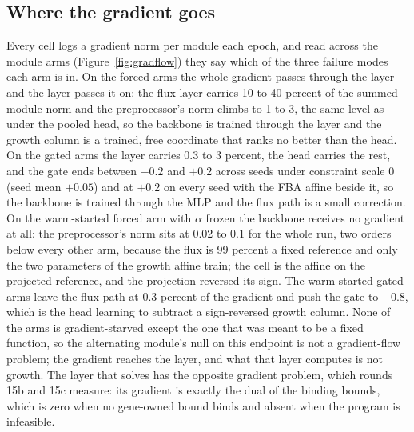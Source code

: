 

\subsection{Where the gradient goes}

Every cell logs a gradient norm per module each epoch, and read across the module arms
(Figure~\ref{fig:gradflow}) they say which of the three failure modes each arm is in. On
the forced arms the whole gradient passes through the layer and the layer passes it on:
the flux layer carries 10 to 40 percent of the summed module norm and the preprocessor's
norm climbs to 1 to 3, the same level as under the pooled head, so the backbone is
trained through the layer and the growth column is a trained, free coordinate that ranks
no better than the head. On the gated arms the layer carries 0.3 to 3 percent, the head
carries the rest, and the gate ends between $-0.2$ and $+0.2$ across seeds under
constraint scale 0 (seed mean $+0.05$) and at $+0.2$ on every seed with the FBA affine
beside it, so the backbone is trained through the MLP and the flux path is a small
correction. On the warm-started forced arm with $\alpha$ frozen the
backbone receives no gradient at all: the preprocessor's norm sits at 0.02 to 0.1 for the
whole run, two orders below every other arm, because the flux is 99 percent a fixed
reference and only the two parameters of the growth affine train; the cell is the affine
on the projected reference, and the projection reversed its sign. The warm-started gated
arms leave the flux path at 0.3 percent of the gradient and push the gate to $-0.8$,
which is the head learning to subtract a sign-reversed growth column. None of the arms is
gradient-starved except the one that was meant to be a fixed function, so the alternating
module's null on this endpoint is not a gradient-flow problem; the gradient reaches the
layer, and what that layer computes is not growth. The layer that solves has the
opposite gradient problem, which rounds 15b and 15c measure: its gradient is exactly the
dual of the binding bounds, which is zero when no gene-owned bound binds and absent when
the program is infeasible.


